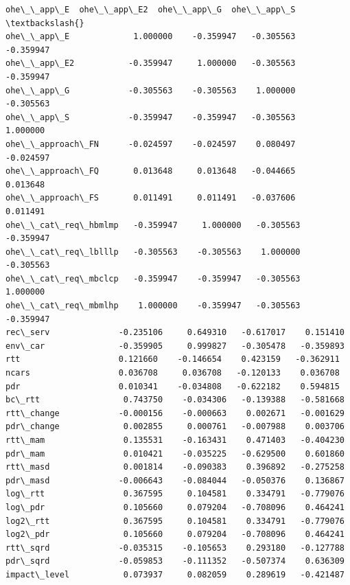 \documentclass[11pt]{article}
\makeatletter
\newcommand{\boxspacing}{\kern\kvtcb@left@rule\kern\kvtcb@boxsep}
\newcommand{\prompt}[4]{
        {\ttfamily\llap{{\color{#2}[#3]:\hspace{3pt}#4}}\vspace{-\baselineskip}}
    }
\makeatother
\begin{document}
            \begin{tcolorbox}[breakable, size=fbox, boxrule=.5pt, pad at break*=1mm, opacityfill=0]
\prompt{Out}{outcolor}{35}{\boxspacing}
\begin{Verbatim}[commandchars=\\\{\}]
                     ohe\_\_app\_E  ohe\_\_app\_E2  ohe\_\_app\_G  ohe\_\_app\_S  \textbackslash{}
ohe\_\_app\_E             1.000000    -0.359947   -0.305563   -0.359947
ohe\_\_app\_E2           -0.359947     1.000000   -0.305563   -0.359947
ohe\_\_app\_G            -0.305563    -0.305563    1.000000   -0.305563
ohe\_\_app\_S            -0.359947    -0.359947   -0.305563    1.000000
ohe\_\_approach\_FN      -0.024597    -0.024597    0.080497   -0.024597
ohe\_\_approach\_FQ       0.013648     0.013648   -0.044665    0.013648
ohe\_\_approach\_FS       0.011491     0.011491   -0.037606    0.011491
ohe\_\_cat\_req\_hbmlmp   -0.359947     1.000000   -0.305563   -0.359947
ohe\_\_cat\_req\_lblllp   -0.305563    -0.305563    1.000000   -0.305563
ohe\_\_cat\_req\_mbclcp   -0.359947    -0.359947   -0.305563    1.000000
ohe\_\_cat\_req\_mbmlhp    1.000000    -0.359947   -0.305563   -0.359947
rec\_serv              -0.235106     0.649310   -0.617017    0.151410
env\_car               -0.359905     0.999827   -0.305478   -0.359893
rtt                    0.121660    -0.146654    0.423159   -0.362911
ncars                  0.036708     0.036708   -0.120133    0.036708
pdr                    0.010341    -0.034808   -0.622182    0.594815
bc\_rtt                 0.743750    -0.034306   -0.139388   -0.581668
rtt\_change            -0.000156    -0.000663    0.002671   -0.001629
pdr\_change             0.002855     0.000761   -0.007988    0.003706
rtt\_mam                0.135531    -0.163431    0.471403   -0.404230
pdr\_mam                0.010421    -0.035225   -0.629500    0.601860
rtt\_masd               0.001814    -0.090383    0.396892   -0.275258
pdr\_masd              -0.006643    -0.084044   -0.050376    0.136867
log\_rtt                0.367595     0.104581    0.334791   -0.779076
log\_pdr                0.105660     0.079204   -0.708096    0.464241
log2\_rtt               0.367595     0.104581    0.334791   -0.779076
log2\_pdr               0.105660     0.079204   -0.708096    0.464241
rtt\_sqrd              -0.035315    -0.105653    0.293180   -0.127788
pdr\_sqrd              -0.059853    -0.111352   -0.507374    0.636309
impact\_level           0.073937     0.082059    0.289619   -0.421487


\end{Verbatim}
\end{tcolorbox}
\end{document}

